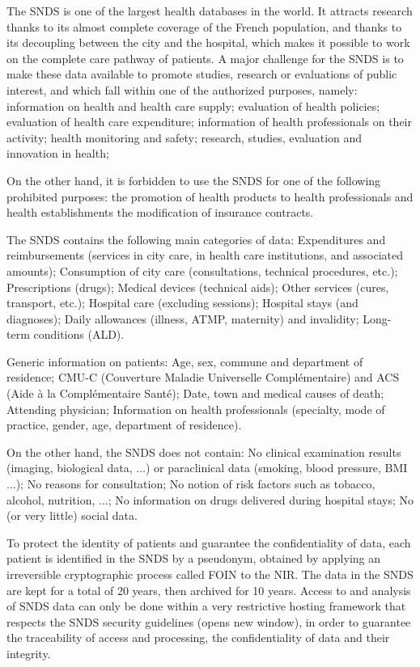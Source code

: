 The SNDS is one of the largest health databases in the world. It attracts
research thanks to its almost complete coverage of the French population, and
thanks to its decoupling between the city and the hospital, which
makes it possible to work on the complete care pathway of patients. A major
challenge for the SNDS is to make these data available to promote studies,
research or evaluations of public interest, and which fall within one of the
authorized purposes, namely:
information on health and health care supply;
evaluation of health policies;
evaluation of health care expenditure;
information of health professionals on their activity;
health monitoring and safety;
research, studies, evaluation and innovation in health;

On the other hand, it is forbidden to use the SNDS for one of the following
prohibited purposes: the promotion of health products to health professionals
and health establishments the modification of insurance contracts.

The SNDS contains the following main categories of data:
Expenditures and reimbursements (services in city care, in health care institutions, and associated amounts);
Consumption of city care (consultations, technical procedures, etc.);
Prescriptions (drugs);
Medical devices (technical aids);
Other services (cures, transport, etc.);
Hospital care (excluding sessions);
Hospital stays (and diagnoses);
Daily allowances (illness, ATMP, maternity) and invalidity;
Long-term conditions (ALD).

Generic information on patients:
Age, sex, commune and department of residence;
CMU-C (Couverture Maladie Universelle Complémentaire) and ACS (Aide à la Complémentaire Santé);
Date, town and medical causes of death;
Attending physician;
Information on health professionals (specialty, mode of practice, gender, age, department of residence).

On the other hand, the SNDS does not contain:
No clinical examination results (imaging, biological data, ...) or paraclinical data (smoking, blood pressure, BMI ...);
No reasons for consultation;
No notion of risk factors such as tobacco, alcohol, nutrition, ...;
No information on drugs delivered during hospital stays;
No (or very little) social data.

To protect the identity of patients and guarantee the confidentiality of data,
each patient is identified in the SNDS by a pseudonym, obtained by applying an
irreversible cryptographic process called FOIN to the NIR. The data in the SNDS
are kept for a total of 20 years, then archived for 10 years.
Access to and analysis of SNDS data can only be done within a very restrictive
hosting framework that respects the SNDS security guidelines (opens new window),
in order to guarantee the traceability of access and processing, the
confidentiality of data and their integrity.

